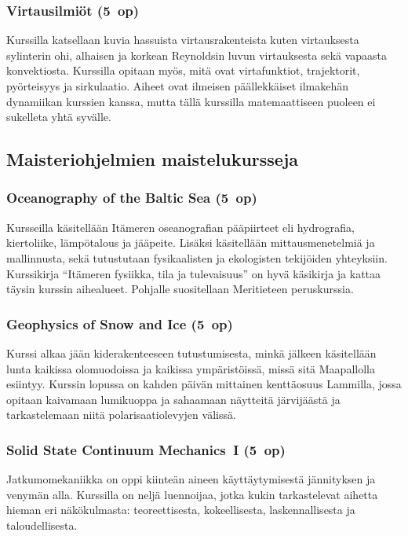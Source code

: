 \documentclass[../ala_hataile.tex]{subfiles}
\begin{document}
\subsubsection*{Virtausilmiöt (5~op)}
Kurssilla katsellaan kuvia hassuista virtausrakenteista kuten virtauksesta sylinterin ohi, alhaisen ja korkean Reynoldsin luvun virtauksesta sekä vapaasta konvektiosta. Kurssilla opitaan myös, mitä ovat virtafunktiot, trajektorit, pyörteisyys ja sirkulaatio. Aiheet ovat ilmeisen päällekkäiset ilmakehän dynamiikan kurssien kanssa, mutta tällä kurssilla matemaattiseen puoleen ei sukelleta yhtä syvälle.

\subsection*{Maisteriohjelmien maistelukursseja}
\subsubsection*{Oceanography of the Baltic Sea (5~op)}
Kursseilla käsitellään Itämeren oseanografian
pääpiirteet eli hydrografia, kiertoliike,
lämpötalous ja jääpeite. Lisäksi
käsitellään mittausmenetelmiä ja mallinnusta,
sekä tutustutaan fysikaalisten ja ekologisten
tekijöiden yhteyksiin. Kurssikirja
``Itämeren fysiikka, tila ja tulevaisuus'' on
hyvä käsikirja ja kattaa täysin
kurssin aihealueet. Pohjalle suositellaan Meritieteen peruskurssia.

\subsubsection*{Geophysics of Snow and Ice (5~op)}
Kurssi alkaa jään kiderakenteeseen tutustumisesta, minkä jälkeen käsitellään lunta kaikissa olomuodoissa ja kaikissa ympäristöissä, missä sitä Maapallolla esiintyy. Kurssin lopussa on kahden päivän mittainen kenttäosuus Lammilla, jossa opitaan kaivamaan lumikuoppa ja sahaamaan näytteitä järvijäästä ja tarkastelemaan niitä polarisaatiolevyjen välissä.

\subsubsection*{Solid State Continuum Mechanics~I (5~op)}
Jatkumomekaniikka on oppi kiinteän aineen käyttäytymisestä jännityksen ja venymän alla. Kurssilla on neljä luennoijaa, jotka kukin tarkastelevat aihetta hieman eri näkökulmasta: teoreettisesta, kokeellisesta, laskennallisesta ja taloudellisesta. 
\end{document}
